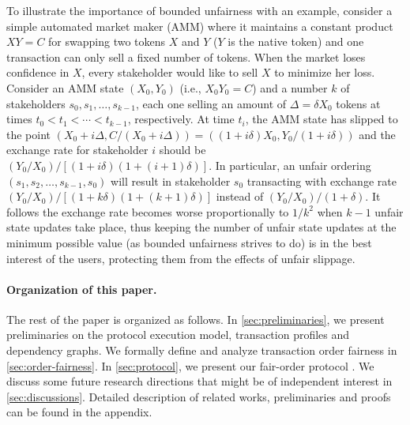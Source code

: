 To illustrate the importance of bounded unfairness with an example, consider a simple automated market maker (AMM) where it maintains a constant product $XY = C$ for swapping two tokens $X$ and $Y$ ($Y$ is the native token) and one transaction can only sell a fixed number of tokens.
%
When the market loses confidence in $X$, every stakeholder would like to sell $X$ to minimize her loss.
%
Consider an AMM state $(X_0, Y_0)$ (i.e., $X_0 Y_0 = C$) and a number $k$ of stakeholders $s_0, s_1, \dots, s_{k - 1}$, each one selling an amount of $\Delta = \delta X_0$ tokens at times $t_0 < t_1 < \cdots < t_{k - 1}$, respectively.
%
At time $t_i$, the AMM state has slipped to the point $(X_0 + i \Delta, C / (X_0 + i \Delta)) = ((1 + i \delta) X_0, Y_0 / (1 + i \delta))$ and the exchange rate for stakeholder $i$ should be $(Y_0 / X_0) / [(1 + i \delta)(1 + (i + 1) \delta)]$.
%
In particular, an unfair ordering $(s_1, s_2, \dots, s_{k-1}, s_0)$ will result in stakeholder $s_0$ transacting with exchange rate $(Y_0 / X_0) / [(1 + k\delta)(1 + (k + 1)\delta)]$ instead of $(Y_0 / X_0)/(1 + \delta)$.
%
It follows the exchange rate becomes worse proportionally to $1 / k^2$  when $k-1$ unfair state updates take place, thus keeping the number of unfair state updates at the minimum possible value (as bounded unfairness strives to do) is in the best interest of the users, protecting them from the effects of unfair slippage.



\paragraph{Organization of this paper.}
%
The rest of the paper is organized as follows.
%
In \cref{sec:preliminaries}, we present preliminaries on the protocol execution model, transaction profiles and dependency graphs.
%
We formally define and analyze transaction order fairness in \cref{sec:order-fairness}.
%
In \cref{sec:protocol}, we present our fair-order protocol \Taxis.
%
We discuss some future research directions that might be of independent interest in \cref{sec:discussions}.
%
Detailed description of related works, preliminaries and proofs can be found in the appendix.
